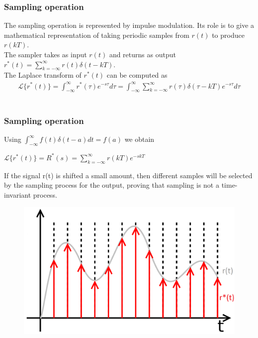 \begin{frame}
	\frametitle{Sampling operation}
	\vspace{-4ex}
	The sampling operation is represented by impulse modulation. Its role is to give a mathematical representation of taking periodic samples from $r(t)$ to produce $r(kT)$. \\
	\medskip
	The sampler takes as input $r(t)$ and returns as output
	\bigskip
	$r^*(t)=\sum_{k=-\infty}^{\infty} r(t)\delta(t-kT)$.\\
	The Laplace transform of $r^*(t)$ can be computed as\\
	\vspace{-2ex} 
	\begin{align*} 
	\mathcal{L}\{r^*(t)\} = \int_{-\infty}^{\infty} r^*(\tau)e^{-s\tau} d\tau = \int_{-\infty}^{\infty} \sum_{k=-\infty}^{\infty} r(\tau)\delta(\tau-kT)e^{-s\tau}d\tau 
	\end{align*}\\
\end{frame}

\begin{frame}
	\frametitle{Sampling operation}
	Using $\int_{-\infty}^{\infty} f(t)\delta(t-a)dt = f(a)$ we obtain \\ 
	\begin{center}
		$\mathcal{L}\{r^*(t)\} = R^*(s) = \sum_{k=-\infty}^{\infty} r(kT)e^{-skT}$
	\end{center}
	If the signal r(t) is shifted a small amount, then different samples will be selected by the sampling process for the output, proving that sampling is not a time-invariant process.
	\begin{figure}
		\includegraphics[width=0.6\linewidth]{sampled_signal}
	\end{figure}
\end{frame}

